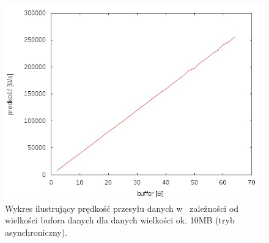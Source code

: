 \documentclass{BscUS}
\begin{document}

\begin{figure}[H]
{
\centering
\includegraphics[width=1\textwidth]{./img/A_10737420Receive}
\caption{Wykres ilustrujący prędkość przesyłu danych w~ zależności od wielkości bufora danych dla danych wielkości ok. 10MB (tryb asynchroniczny).}
\label{fig:A_10737420Receive}
}
\end{figure}
\end{document}
